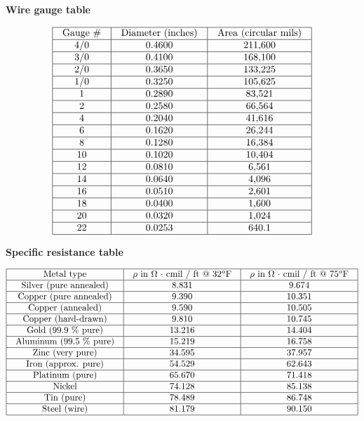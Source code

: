 

\centerline{\bf Wire gauge table}


$$\vbox{\offinterlineskip
\halign{\strut
\vrule \quad\hfil # \ \hfil & 
\vrule \quad\hfil # \ \hfil & 
\vrule \quad\hfil # \ \hfil \vrule \cr
\noalign{\hrule}
%
Gauge \# & Diameter (inches) & Area (circular mils) \cr
%
\noalign{\hrule}
%
4/0 & 0.4600 & 211,600 \cr
%
\noalign{\hrule}
%
3/0 & 0.4100 & 168,100 \cr
%
\noalign{\hrule}
%
2/0 & 0.3650 & 133,225 \cr
%
\noalign{\hrule}
%
1/0 & 0.3250 & 105,625 \cr
%
\noalign{\hrule}
%
1 & 0.2890 & 83,521 \cr
%
\noalign{\hrule}
%
2 & 0.2580 & 66,564 \cr
%
\noalign{\hrule}
%
4 & 0.2040 & 41,616 \cr
%
\noalign{\hrule}
%
6 & 0.1620 & 26,244 \cr
%
\noalign{\hrule}
%
8 & 0.1280 & 16,384 \cr
%
\noalign{\hrule}
%
10 & 0.1020 & 10,404 \cr
%
\noalign{\hrule}
%
12 & 0.0810 & 6,561 \cr
%
\noalign{\hrule}
%
14 & 0.0640 & 4,096 \cr
%
\noalign{\hrule}
%
16 & 0.0510 & 2,601 \cr
%
\noalign{\hrule}
%
18 & 0.0400 & 1,600 \cr
%
\noalign{\hrule}
%
20 & 0.0320 & 1,024 \cr
%
\noalign{\hrule}
%
22 & 0.0253 & 640.1 \cr
%
\noalign{\hrule}
} %
}$$ %


\vskip 50pt



\centerline{\bf Specific resistance table}


$$\vbox{\offinterlineskip
\halign{\strut
\vrule \quad\hfil # \ \hfil & 
\vrule \quad\hfil # \ \hfil & 
\vrule \quad\hfil # \ \hfil \vrule \cr
\noalign{\hrule}
%
Metal type & $\rho$ in $\Omega$ $\cdot$ cmil / ft @ 32$^{o}$F & $\rho$ in $\Omega$ $\cdot$ cmil / ft @ 75$^{o}$F \cr
%
\noalign{\hrule}
%
Silver (pure annealed) & 8.831 & 9.674 \cr
%
\noalign{\hrule}
%
Copper (pure annealed) & 9.390 & 10.351 \cr
%
\noalign{\hrule}
%
Copper (annealed) & 9.590 & 10.505 \cr
%
\noalign{\hrule}
%
Copper (hard-drawn) & 9.810 & 10.745 \cr
%
\noalign{\hrule}
%
Gold (99.9 \% pure) & 13.216 & 14.404 \cr
%
\noalign{\hrule}
%
Aluminum (99.5 \% pure) & 15.219 & 16.758 \cr
%
\noalign{\hrule}
%
Zinc (very pure) & 34.595 & 37.957 \cr
%
\noalign{\hrule}
%
Iron (approx. pure) & 54.529 & 62.643 \cr
%
\noalign{\hrule}
%
Platinum (pure) & 65.670 & 71.418 \cr
%
\noalign{\hrule}
%
Nickel & 74.128 & 85.138 \cr
%
\noalign{\hrule}
%
Tin (pure) & 78.489 & 86.748 \cr
%
\noalign{\hrule}
%
Steel (wire) & 81.179 & 90.150 \cr
%
\noalign{\hrule}
} %
}$$ %

